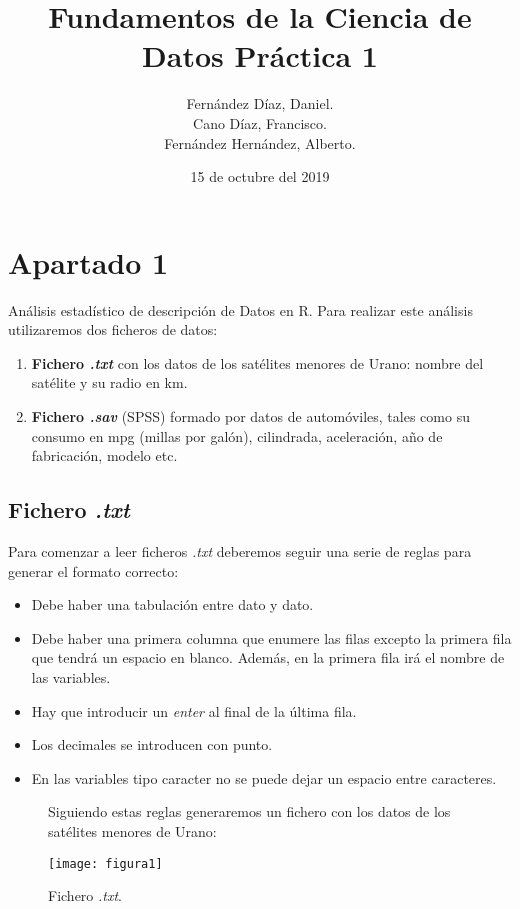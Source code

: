\documentclass [a4paper] {article}
\title{\textbf{Fundamentos de la Ciencia de Datos Práctica 1}}
\author{
	Fernández Díaz, Daniel.\\
	Cano Díaz, Francisco.\\
	Fernández Hernández, Alberto.\\
}
\date{15 de octubre del 2019}
\begin{document}
\maketitle

\section{Apartado 1}

Análisis estadístico de descripción de Datos en R. Para realizar este análisis utilizaremos dos ficheros de datos:
\begin{enumerate}
	\item \textbf{Fichero \textit{.txt}} con los datos de los satélites menores de Urano: nombre del satélite y su radio en km.
	\item \textbf{Fichero \textit{.sav}} (SPSS) formado por datos de automóviles, tales como su consumo en mpg (millas por galón), cilindrada, aceleración, año de fabricación, modelo etc.
\end{enumerate}

\subsection{Fichero \textit{.txt}}
Para comenzar a leer ficheros \textit{.txt} deberemos seguir una serie de reglas para generar el formato correcto:
\begin{itemize}
	\item Debe haber una tabulación entre dato y dato.
	\item Debe haber una primera columna que enumere las filas excepto la primera fila que tendrá un espacio en blanco. Además, en la primera fila irá el nombre de las variables.
	\item Hay que introducir un \textit{enter} al final de la última fila.
	\item Los decimales se introducen con punto.
	\item En las variables tipo caracter no se puede dejar un espacio entre caracteres.
\end{itemize}

\newpage

\begin{figure}
Siguiendo estas reglas generaremos un fichero con los datos de los satélites menores de Urano:

\centering
\texttt{[image: figura1]}
\caption{Fichero \textit{.txt}.}
\end{figure}
\end{document}
